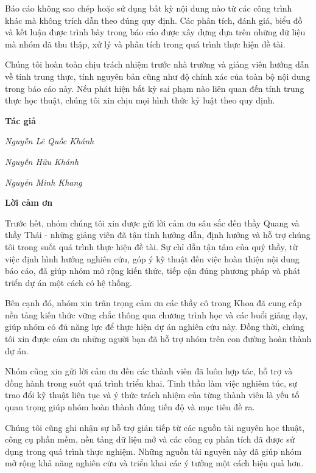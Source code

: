 \documentclass[12pt, a4paper]{article}
\theoremstyle{definition}
\begin{document}
Báo cáo không sao chép hoặc sử dụng bất kỳ nội dung nào từ các công trình khác mà không trích dẫn theo đúng quy định. Các phân tích, đánh giá, biểu đồ và kết luận được trình bày trong báo cáo được xây dựng dựa trên những dữ liệu mà nhóm đã thu thập, xử lý và phân tích trong quá trình thực hiện đề tài.

Chúng tôi hoàn toàn chịu trách nhiệm trước nhà trường và giảng viên hướng dẫn về tính trung thực, tính nguyên bản cũng như độ chính xác của toàn bộ nội dung trong báo cáo này. Nếu phát hiện bất kỳ sai phạm nào liên quan đến tính trung thực học thuật, chúng tôi xin chịu mọi hình thức kỷ luật theo quy định.

\par\hfill\textbf{Tác giả}\hspace{1cm}
\par\hfill\textit{Nguyễn Lê Quốc Khánh}
\par\hfill\textit{Nguyễn Hữu Khánh}\hspace{0.3cm}
\par\hfill\textit{Nguyễn Minh Khang}\hspace{0.2cm}
\newpage

\begin{center}
    \textbf{\Large Lời cảm ơn}
\end{center}
\quad
Trước hết, nhóm chúng tôi xin được gửi lời cảm ơn sâu sắc đến thầy Quang và thầy Thái - những giảng viên đã tận tình hướng dẫn, định hướng và hỗ trợ chúng tôi trong suốt quá trình thực hiện đề tài. Sự chỉ dẫn tận tâm của quý thầy, từ việc định hình hướng nghiên cứu, góp ý kỹ thuật đến việc hoàn thiện nội dung báo cáo, đã giúp nhóm mở rộng kiến thức, tiếp cận đúng phương pháp và phát triển dự án một cách có hệ thống.

Bên cạnh đó, nhóm xin trân trọng cảm ơn các thầy cô trong Khoa đã cung cấp nền tảng kiến thức vững chắc thông qua chương trình học và các buổi giảng dạy, giúp nhóm có đủ năng lực để thực hiện dự án nghiên cứu này. Đồng thời, chúng tôi xin được cảm ơn những người bạn đã hỗ trợ nhóm trên con đường hoàn thành dự án.

Nhóm cũng xin gửi lời cảm ơn đến các thành viên đã luôn hợp tác, hỗ trợ và đồng hành trong suốt quá trình triển khai. Tinh thần làm việc nghiêm túc, sự trao đổi kỹ thuật liên tục và ý thức trách nhiệm của từng thành viên là yếu tố quan trọng giúp nhóm hoàn thành đúng tiến độ và mục tiêu đề ra.

Chúng tôi cũng ghi nhận sự hỗ trợ gián tiếp từ các nguồn tài nguyên học thuật, công cụ phần mềm, nền tảng dữ liệu mở và các công cụ phân tích đã được sử dụng trong quá trình thực nghiệm. Những nguồn tài nguyên này đã giúp nhóm mở rộng khả năng nghiên cứu và triển khai các ý tưởng một cách hiệu quả hơn.
\end{document}
